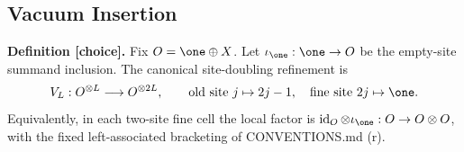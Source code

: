 
\subsection{Vacuum Insertion}

\textbf{Definition [choice].}  Fix \(O=\one\oplus X\).  Let
\(\iota_{\one}:\one\to O\) be the empty-site summand inclusion.  The canonical
site-doubling refinement is
\[
  V_L:O^{\otimes L}\longrightarrow O^{\otimes 2L},
  \qquad
  \text{old site }j\mapsto 2j-1,\quad \text{fine site }2j\mapsto\one .
\]
Equivalently, in each two-site fine cell the local factor is
\(\operatorname{id}_O\otimes\iota_{\one}:O\to O\otimes O\), with the fixed
left-associated bracketing of CONVENTIONS.md (r).


